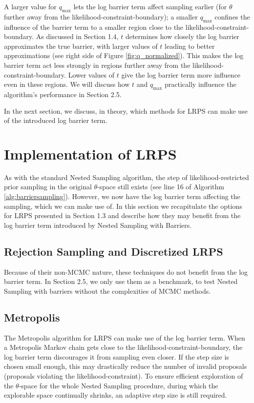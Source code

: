 \documentclass[12pt, a4paper]{report}
\begin{document}
A larger value for $q_{\textrm{max}}$ lets the log barrier term affect sampling earlier (for $\theta$ further away from the likelihood-constraint-boundary); a smaller $q_{\textrm{max}}$ confines the influence of the barrier term to a smaller region close to the likelihood-constraint-boundary.
As discussed in Section 1.4, $t$ determines how closely the log barrier approximates the true barrier, with larger values of $t$ leading to better approximations (see right side of Figure \ref{fig:q_normalized}).
This makes the log barrier term act less strongly in regions further away from the likelihood-constraint-boundary.
Lower values of $t$ give the log barrier term more influence even in these regions.
We will discuss how $t$ and $q_{\textrm{max}}$ practically influence the algorithm's performance in Section 2.5.

In the next section, we discuss, in theory, which methods for LRPS can make use of the introduced log barrier term.

\section{Implementation of LRPS}
As with the standard Nested Sampling algorithm, the step of likelihood-restricted prior sampling in the original $\theta$-space still exists (see line 16 of Algorithm \ref{alg:barriersampling}).
However, we now have the log barrier term affecting the sampling, which we can make use of.
In this section we recapitulate the options for LRPS presented in Section 1.3 and describe how they may benefit from the log barrier term introduced by Nested Sampling with Barriers.

\subsection{Rejection Sampling and Discretized LRPS}
Because of their non-MCMC nature, these techniques do not benefit from the log barrier term.
In Section 2.5, we only use them as a benchmark, to test Nested Sampling with barriers without the complexities of MCMC methods.

\subsection{Metropolis}
The Metropolis algorithm for LRPS can make use of the log barrier term.
When a Metropolis Markov chain gets close to the likelihood-constraint-boundary, the log barrier term discourages it from sampling even closer.
If the step size is chosen small enough, this may drastically reduce the number of invalid proposals (proposals violating the likelihood-constraint).
To ensure efficient exploration of the $\theta$-space for the whole Nested Sampling procedure, during which the explorable space continually shrinks, an adaptive step size is still required.
\end{document}

